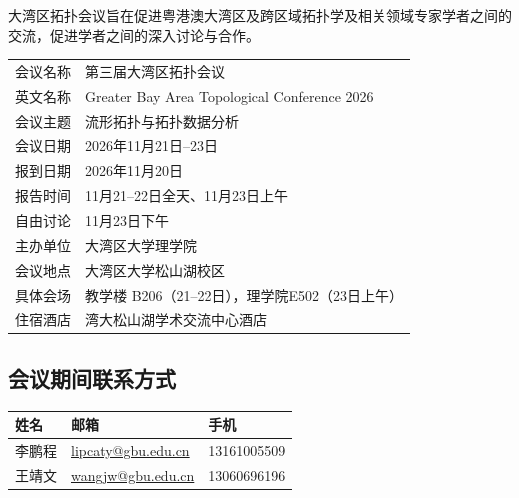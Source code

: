 \documentclass[12pt,a4paper,twoside,UTF8,fontset=none]{ctexart}
\begin{document}
大湾区拓扑会议旨在促进粤港澳大湾区及跨区域拓扑学及相关领域专家学者之间的交流，促进学者之间的深入讨论与合作。

\vspace{0.8em}
\renewcommand{\arraystretch}{1.45}
\noindent
\begin{tabularx}{\textwidth}{B{3.2cm}Y}
  \toprule
  会议名称 & 第三届大湾区拓扑会议\\
  英文名称 & Greater Bay Area Topological Conference 2026\\
  会议主题 & 流形拓扑与拓扑数据分析\\
  会议日期 & 2026年11月21日--23日\\
  报到日期 & 2026年11月20日\\
  报告时间 & 11月21--22日全天、11月23日上午\\
  自由讨论 & 11月23日下午\\
  主办单位 & 大湾区大学理学院\\
  会议地点 & 大湾区大学松山湖校区\\
  具体会场 & 教学楼 B206（21--22日），理学院E502（23日上午） \\
  住宿酒店 & 湾大松山湖学术交流中心酒店\\
  \bottomrule
\end{tabularx}

\vspace{1.2em}
\noindent
{}

\vspace{1.0em}
\subsection*{会议期间联系方式}
\small
\renewcommand{\arraystretch}{1.45}
\noindent
\begin{tabularx}{\textwidth}{B{2.6cm}Y L{3.6cm}}
  \toprule
  姓名 & \textbf{邮箱} & \textbf{手机}\\
  \midrule
  李鹏程 & \href{mailto:lipcaty@gbu.edu.cn}{lipcaty@gbu.edu.cn} & \mbox{13161005509}\\
  王靖文 & \href{mailto:wangjw@gbu.edu.cn}{wangjw@gbu.edu.cn} & \mbox{13060696196}\\
  \bottomrule
\end{tabularx}
\normalsize
\end{document}
